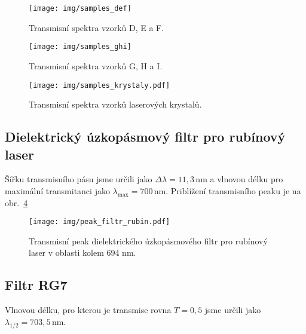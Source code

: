 \begin{figure}[!hbt]
  \centering
    \texttt{[image: img/samples\_def]} 
    \caption{Transmisní spektra vzorků D, E a F.}
    \label{fig:def} %
\end{figure}  

\begin{figure}[!hbt]
  \centering
    \texttt{[image: img/samples\_ghi]} 
    \caption{Transmisní spektra vzorků G, H a I.}
    \label{fig:ghi} %
\end{figure}  

\begin{figure}[!hbt]
  \centering
    \texttt{[image: img/samples\_krystaly.pdf]} 
    \caption{Transmisní spektra vzorků laserových krystalů.}
    \label{fig:las} %
\end{figure} 
	
	
	\subsection{Dielektrický úzkopásmový filtr pro rubínový laser}
	Šířku transmisního pásu jsme určili jako $\Delta\lambda=11,3\, \mathrm{nm}$ a vlnovou délku pro maximální transmitanci jako $\lambda_{\mathrm{max}}=700\,\mathrm{nm}$. Priblížení transmisního peaku je na obr.~\ref{fig:rubin_filtr}

\begin{figure}[!hbt]
  \centering
    \texttt{[image: img/peak\_filtr\_rubin.pdf]} 
    \caption{Transmisní peak dielektrického úzkopásmového filtr pro rubínový laser v oblasti kolem 694 nm.}
    \label{fig:rubin_filtr} %
\end{figure} 
	
	\subsection{Filtr RG7}
	Vlnovou délku, pro kterou je transmise rovna $T=0,5$ jsme určili jako $\lambda_{1/2}=703,5\,\mathrm{nm}$.
	
